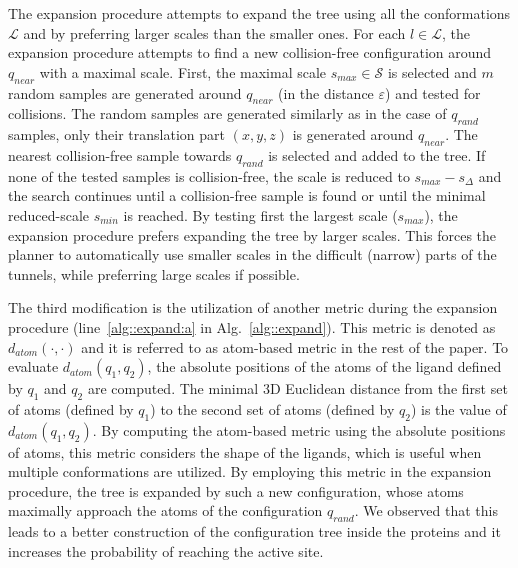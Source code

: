 \documentclass[usletter, 10pt, conference]{ieeeconf} %
\def\qrand{q_{rand}}
\def\qnear{q_{near}}
\def\da{d_{atom}}
\def\smin{s_{min}}
\def\smax{s_{max}}
\def\sdelta{s_{\Delta}}
\def\L{\mathcal{L}}
\def\S{\mathcal{S}}
\begin{document}
The expansion procedure attempts to expand the tree using all the conformations $\L$ and by preferring larger scales than the smaller ones.
For each $l \in \L$, the expansion procedure attempts to find a new collision-free configuration around $\qnear$ with a maximal scale.
First, the maximal scale $\smax \in \S$ is selected and $m$ random samples are generated around $\qnear$ (in the distance $\varepsilon$) 
and tested for collisions.
The random samples are generated similarly as in the case of $\qrand$ samples, only their translation
part $(x,y,z)$ is generated around $\qnear$.
The nearest collision-free sample towards $\qrand$ is selected and added to the tree.
If none of the tested samples is collision-free, the scale is reduced to $\smax-\sdelta$ and the search continues
until a collision-free sample is found or until the minimal reduced-scale $\smin$ is reached.
By testing first the largest scale ($\smax$), the expansion procedure prefers expanding the tree by larger scales.
This forces the planner to automatically use smaller scales in the difficult (narrow) parts of the tunnels, while preferring
large scales if possible.

The third modification is the utilization of another metric during the expansion procedure (line~\ref{alg::expand:a} in Alg.~\ref{alg::expand}).
This metric is denoted as $\da(\cdot,\cdot)$ and it is referred to as atom-based metric in the rest of the paper.
To evaluate $\da(q_1,q_2)$, the absolute positions of the atoms of the ligand defined by $q_1$ and $q_2$ are computed.
The minimal 3D Euclidean distance from the first set of atoms (defined by $q_1$) to the second set of atoms (defined by $q_2$) is the value of 
$\da(q_1,q_2)$.
By computing the atom-based metric using the absolute positions of atoms, this metric considers the shape of the ligands, which
is useful when multiple conformations are utilized.
By employing this metric in the expansion procedure, the tree is expanded by such a new configuration, whose atoms maximally approach
the atoms of the configuration $\qrand$.
We observed that this leads to a better construction of the configuration tree inside the proteins and it increases the probability
of reaching the active site.

\end{document}
